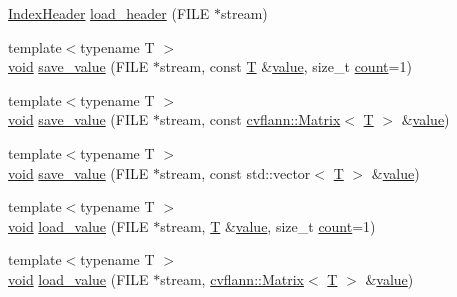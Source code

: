 \begin{DoxyCompactItemize}
\item 
\hyperlink{structcvflann_1_1IndexHeader}{Index\-Header} \hyperlink{namespacecvflann_a4dd93d5ecc84d4679ada8a7f404d458f}{load\-\_\-header} (F\-I\-L\-E $\ast$stream)
\item 
{\footnotesize template$<$typename T $>$ }\\\hyperlink{legacy_8hpp_a8bb47f092d473522721002c86c13b94e}{void} \hyperlink{namespacecvflann_af21cc31d343e3e1132f34e11094d49a1}{save\-\_\-value} (F\-I\-L\-E $\ast$stream, const \hyperlink{calib3d_8hpp_a3efb9551a871ddd0463079a808916717}{T} \&\hyperlink{highgui__c_8h_ad4670c92695d4327c21292905a803901}{value}, size\-\_\-t \hyperlink{tracking_8hpp_a88d78b1935cd8bdee70a44eaaf326b1e}{count}=1)
\item 
{\footnotesize template$<$typename T $>$ }\\\hyperlink{legacy_8hpp_a8bb47f092d473522721002c86c13b94e}{void} \hyperlink{namespacecvflann_af6016a4a330406ac3ad8b5fe38de0389}{save\-\_\-value} (F\-I\-L\-E $\ast$stream, const \hyperlink{classcvflann_1_1Matrix}{cvflann\-::\-Matrix}$<$ \hyperlink{calib3d_8hpp_a3efb9551a871ddd0463079a808916717}{T} $>$ \&\hyperlink{highgui__c_8h_ad4670c92695d4327c21292905a803901}{value})
\item 
{\footnotesize template$<$typename T $>$ }\\\hyperlink{legacy_8hpp_a8bb47f092d473522721002c86c13b94e}{void} \hyperlink{namespacecvflann_a1fa3d0150adc438dda4eea1830d5a58b}{save\-\_\-value} (F\-I\-L\-E $\ast$stream, const std\-::vector$<$ \hyperlink{calib3d_8hpp_a3efb9551a871ddd0463079a808916717}{T} $>$ \&\hyperlink{highgui__c_8h_ad4670c92695d4327c21292905a803901}{value})
\item 
{\footnotesize template$<$typename T $>$ }\\\hyperlink{legacy_8hpp_a8bb47f092d473522721002c86c13b94e}{void} \hyperlink{namespacecvflann_ac76450e068ff8d95e2e5736141201faf}{load\-\_\-value} (F\-I\-L\-E $\ast$stream, \hyperlink{calib3d_8hpp_a3efb9551a871ddd0463079a808916717}{T} \&\hyperlink{highgui__c_8h_ad4670c92695d4327c21292905a803901}{value}, size\-\_\-t \hyperlink{tracking_8hpp_a88d78b1935cd8bdee70a44eaaf326b1e}{count}=1)
\item 
{\footnotesize template$<$typename T $>$ }\\\hyperlink{legacy_8hpp_a8bb47f092d473522721002c86c13b94e}{void} \hyperlink{namespacecvflann_a9d6bc8c23ad3007c207081c354b243cf}{load\-\_\-value} (F\-I\-L\-E $\ast$stream, \hyperlink{classcvflann_1_1Matrix}{cvflann\-::\-Matrix}$<$ \hyperlink{calib3d_8hpp_a3efb9551a871ddd0463079a808916717}{T} $>$ \&\hyperlink{highgui__c_8h_ad4670c92695d4327c21292905a803901}{value})

\end{DoxyCompactItemize}
